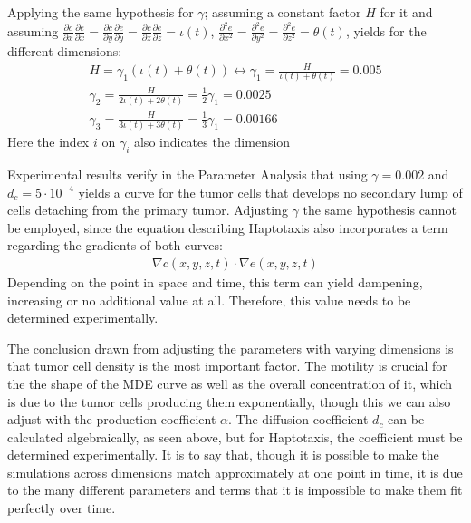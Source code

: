 Applying the same hypothesis for $\gamma$; assuming a constant factor $H$ for it and assuming $\frac{\partial c}{\partial x}\frac{\partial e}{\partial x}=\frac{\partial c}{\partial y}\frac{\partial e}{\partial y}=\frac{\partial c}{\partial z}\frac{\partial e}{\partial z}=\iota(t)$, $\frac{\partial^{2}e}{\partial x^{2}}=\frac{\partial^{2}e}{\partial y^{2}}=\frac{\partial^{2}e}{\partial z^{2}}=\theta(t)$, yields for the different dimensions:
\begin{align*}
    H=\gamma_{1}(\iota(t) +\theta(t) )\leftrightarrow \gamma_1 = \frac{H}{\iota(t) + \theta(t)} = 0.005 \\
    \gamma_2 = \frac{H}{2\iota(t) + 2\theta(t)} = \frac{1}{2} \gamma_1 = 0.0025 \\
    \gamma_3 = \frac{H}{3\iota(t) + 3\theta(t)} = \frac{1}{3} \gamma_1 = 0.00166
\end{align*}
Here the index $i$ on $\gamma_{i}$ also indicates the dimension

Experimental results verify in the Parameter Analysis that using $\gamma=0.002$ and $d_c=5\cdot 10^{-4}$ yields a curve for the tumor cells that develops no secondary lump of cells detaching from the primary tumor. Adjusting $\gamma$ the same hypothesis cannot be employed, since the equation describing Haptotaxis also incorporates a term regarding the gradients of both curves:
\begin{align*} 
    \nabla c(x,y,z,t) \cdot \nabla e(x,y,z,t)
\end{align*}
Depending on the point in space and time, this term can yield dampening, increasing or no additional value at all. Therefore, this value needs to be determined experimentally.

The conclusion drawn from adjusting the parameters with varying dimensions is that tumor cell density is the most important factor. The motility is crucial for the the shape of the MDE curve as well as the overall concentration of it, which is due to the tumor cells producing them exponentially, though this we can also adjust with the production coefficient $\alpha$. The diffusion coefficient $d_c$ can be calculated algebraically, as seen above, but for Haptotaxis, the coefficient must be determined experimentally. It is to say that, though it is possible to make the simulations across dimensions match approximately at one point in time, it is due to the many different parameters and terms that it is impossible to make them fit perfectly over time.


